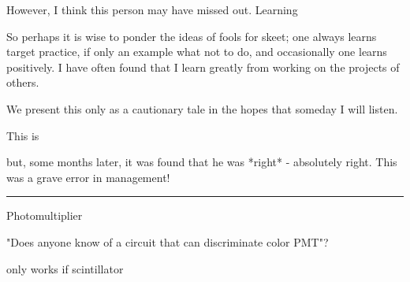 \documentclass[paper.tex]{subfiles}
\begin{document}
However, I think this person may have missed out. Learning 

So perhaps it is wise to ponder the ideas of fools for skeet; one always learns target practice, if only an example what not to do, and occasionally one learns positively. I have often found that I learn greatly from working on the projects of others.

We present this only as a cautionary tale in the hopes that someday I will listen.

 This is 

but, some months later, it was found that he was *right* - absolutely right. This was a grave error in management!

\rule{\linewidth}{0.2pt}

Photomultiplier

"Does anyone know of a circuit that can discriminate color PMT"?

only works if scintillator


\end{document}

